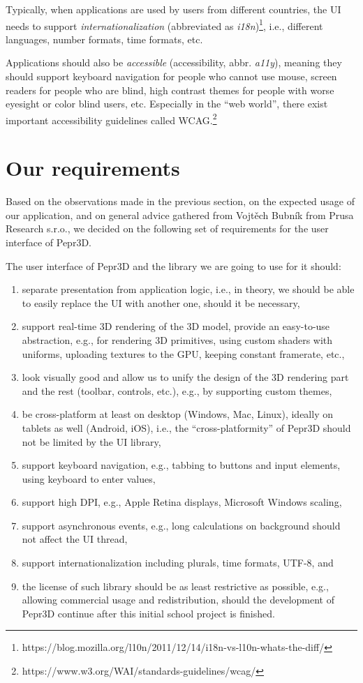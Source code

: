 Typically, when applications are used by users from different countries, the UI needs to support \emph{internationalization} (abbreviated as \emph{i18n})\footnote{https://blog.mozilla.org/l10n/2011/12/14/i18n-vs-l10n-whats-the-diff/}, i.e., different languages, number formats, time formats, etc.

Applications should also be \emph{accessible} (accessibility, abbr. \emph{a11y}), meaning they should support keyboard navigation for people who cannot use mouse, screen readers for people who are blind, high contrast themes for people with worse eyesight or color blind users, etc.
Especially in the ``web world'', there exist important accessibility guidelines called WCAG.\footnote{https://www.w3.org/WAI/standards-guidelines/wcag/}

\section{Our requirements}\label{sec:uireqs}

Based on the observations made in the previous section, on the expected usage of our application, and on general advice gathered from Vojtěch Bubník from Prusa Research s.r.o., we decided on the following set of requirements for the user interface of Pepr3D.

The user interface of Pepr3D and the library we are going to use for it should:
%
\begin{enumerate}
\setlength\itemsep{0em}
\item separate presentation from application logic, i.e., in theory, we should be able to easily replace the UI with another one, should it be necessary,
\item support real-time 3D rendering of the 3D model, provide an easy-to-use abstraction, e.g., for rendering 3D primitives, using custom shaders with uniforms, uploading textures to the GPU, keeping constant framerate, etc.,
\item look visually good and allow us to unify the design of the 3D rendering part and the rest (toolbar, controls, etc.), e.g., by supporting custom themes,
\item be cross-platform at least on desktop (Windows, Mac, Linux), ideally on tablets as well (Android, iOS), i.e., the ``cross-platformity'' of Pepr3D should not be limited by the UI library,
\item support keyboard navigation, e.g., tabbing to buttons and input elements, using keyboard to enter values,
\item support high DPI, e.g., Apple Retina displays, Microsoft Windows scaling,
\item support asynchronous events, e.g., long calculations on background should not affect the UI thread,
\item support internationalization including plurals, time formats, UTF-8, and
\item the license of such library should be as least restrictive as possible, e.g., allowing commercial usage and redistribution, should the development of Pepr3D continue after this initial school project is finished.
\end{enumerate}

